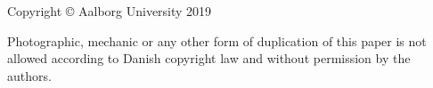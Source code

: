 \thispagestyle{empty}
{\small
\strut\vfill %
\noindent Copyright \copyright{} Aalborg University 2019\par
\vspace{0.2cm}
\noindent Photographic, mechanic or any other form of duplication of this paper is not allowed according to Danish copyright law and without permission by the authors.
}
\clearpage

